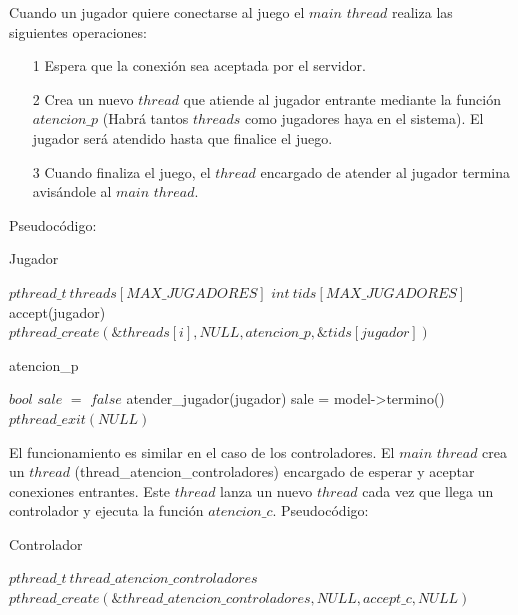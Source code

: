 Cuando un jugador quiere conectarse al juego el $main$ $thread$ realiza las siguientes operaciones:

\begin{itemize}
	\item[1] Espera que la conexión sea aceptada por el servidor.
	\item[2] Crea un nuevo $thread$ que atiende al jugador entrante mediante la función $atencion\_p$ (Habrá tantos $threads$ como jugadores haya en el sistema). El jugador será atendido hasta que finalice el juego.
	\item[3] Cuando finaliza el juego, el $thread$ encargado de atender al jugador termina avisándole al $main$ $thread$.
\end{itemize}

Pseudocódigo:

\begin{algorithm}[H]
\caption{Jugador}\label{ej1}
\begin{algorithmic}[1]
	\State $pthread\_t \ threads[MAX\_JUGADORES]$ 
	\State $int \ tids[MAX\_JUGADORES]$
		\State accept(jugador)
		\State $pthread\_create(\&threads[i],NULL,atencion\_p,\&tids[jugador])$
	\EndFor
\EndProcedure
\end{algorithmic}
\end{algorithm}

\begin{algorithm}[H]
\caption{atencion\_p}\label{ej1}
\begin{algorithmic}[1]
	\State $bool$ $sale$ $=$ $false$ 
		\State atender\_jugador(jugador)
		\State sale = model->termino()
	\EndWhile
	\State $pthread\_exit(NULL)$
\EndProcedure
\end{algorithmic}
\end{algorithm}

El funcionamiento es similar en el caso de los controladores. El $main$ $thread$ crea un $thread$ (thread\_atencion\_controladores) encargado de esperar y aceptar conexiones entrantes. Este $thread$ lanza un nuevo $thread$ cada vez que llega un controlador y ejecuta la función $atencion\_c$. Pseudocódigo:

\begin{algorithm}[H]
\caption{Controlador}\label{ej1}
\begin{algorithmic}[1]
	\State $pthread\_t  \ thread\_atencion\_controladores$
	\State $pthread\_create(\&thread\_atencion\_controladores,NULL,accept\_c,NULL)$
\EndProcedure
\end{algorithmic}
\end{algorithm}

